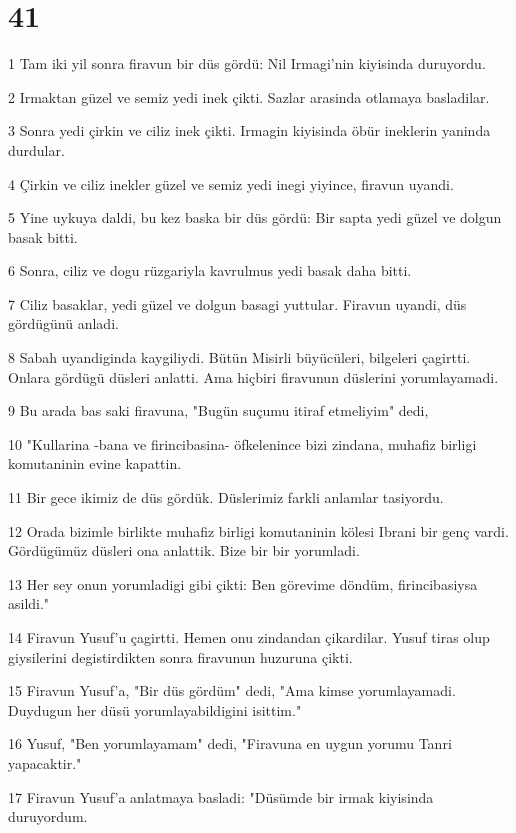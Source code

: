 \chapter{41}

\par 1 Tam iki yil sonra firavun bir düs gördü: Nil Irmagi'nin kiyisinda duruyordu.
\par 2 Irmaktan güzel ve semiz yedi inek çikti. Sazlar arasinda otlamaya basladilar.
\par 3 Sonra yedi çirkin ve ciliz inek çikti. Irmagin kiyisinda öbür ineklerin yaninda durdular.
\par 4 Çirkin ve ciliz inekler güzel ve semiz yedi inegi yiyince, firavun uyandi.
\par 5 Yine uykuya daldi, bu kez baska bir düs gördü: Bir sapta yedi güzel ve dolgun basak bitti.
\par 6 Sonra, ciliz ve dogu rüzgariyla kavrulmus yedi basak daha bitti.
\par 7 Ciliz basaklar, yedi güzel ve dolgun basagi yuttular. Firavun uyandi, düs gördügünü anladi.
\par 8 Sabah uyandiginda kaygiliydi. Bütün Misirli büyücüleri, bilgeleri çagirtti. Onlara gördügü düsleri anlatti. Ama hiçbiri firavunun düslerini yorumlayamadi.
\par 9 Bu arada bas saki firavuna, "Bugün suçumu itiraf etmeliyim" dedi,
\par 10 "Kullarina -bana ve firincibasina- öfkelenince bizi zindana, muhafiz birligi komutaninin evine kapattin.
\par 11 Bir gece ikimiz de düs gördük. Düslerimiz farkli anlamlar tasiyordu.
\par 12 Orada bizimle birlikte muhafiz birligi komutaninin kölesi Ibrani bir genç vardi. Gördügümüz düsleri ona anlattik. Bize bir bir yorumladi.
\par 13 Her sey onun yorumladigi gibi çikti: Ben görevime döndüm, firincibasiysa asildi."
\par 14 Firavun Yusuf'u çagirtti. Hemen onu zindandan çikardilar. Yusuf tiras olup giysilerini degistirdikten sonra firavunun huzuruna çikti.
\par 15 Firavun Yusuf'a, "Bir düs gördüm" dedi, "Ama kimse yorumlayamadi. Duydugun her düsü yorumlayabildigini isittim."
\par 16 Yusuf, "Ben yorumlayamam" dedi, "Firavuna en uygun yorumu Tanri yapacaktir."
\par 17 Firavun Yusuf'a anlatmaya basladi: "Düsümde bir irmak kiyisinda duruyordum.
